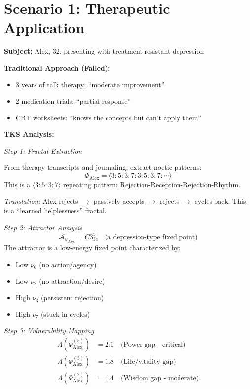 \documentclass[11pt,twoside]{book}
\theoremstyle{definition}
\theoremstyle{plain}
\theoremstyle{remark}
\newcommand{\noe}[1]{\nu_{#1}}
\newcommand{\Frac}{\Phi}
\newcommand{\PsychAttractor}{\mathcal{A}_\psi}
\newcommand{\Lacunarity}{\Lambda}
\begin{document}
\section{Scenario 1: Therapeutic Application}

\begin{tcolorbox}[colback=yellow!5!white,colframe=yellow!65!black,title=\textbf{Scenario: Depression Treatment via Attractor Shift},breakable]

\textbf{Subject:} Alex, 32, presenting with treatment-resistant depression

\textbf{Traditional Approach (Failed):}
\begin{itemize}
    \item 3 years of talk therapy: ``moderate improvement''
    \item 2 medication trials: ``partial response''
    \item CBT worksheets: ``knows the concepts but can't apply them''
\end{itemize}

\textbf{TKS Analysis:}

\textit{Step 1: Fractal Extraction}

From therapy transcripts and journaling, extract noetic patterns:
\[
    \Frac_{\mathrm{Alex}} = \langle 3:5:3:7:3:5:3:7:\cdots \rangle
\]
This is a $\langle 3:5:3:7 \rangle$ repeating pattern: Rejection-Reception-Rejection-Rhythm.

\textit{Translation:} Alex rejects $\to$ passively accepts $\to$ rejects $\to$ cycles back. This is a ``learned helplessness'' fractal.

\textit{Step 2: Attractor Analysis}
\[
    \PsychAttractor_{\mathrm{Alex}} = C3^5_{3c} \quad \text{(a depression-type fixed point)}
\]
The attractor is a low-energy fixed point characterized by:
\begin{itemize}
    \item Low $\noe{6}$ (no action/agency)
    \item Low $\noe{2}$ (no attraction/desire)
    \item High $\noe{3}$ (persistent rejection)
    \item High $\noe{7}$ (stuck in cycles)
\end{itemize}

\textit{Step 3: Vulnerability Mapping}
\begin{align*}
    \Lacunarity(\Frac_{\mathrm{Alex}}^{(5)}) &= 2.1 \quad \text{(Power gap - critical)} \\
    \Lacunarity(\Frac_{\mathrm{Alex}}^{(3)}) &= 1.8 \quad \text{(Life/vitality gap)} \\
    \Lacunarity(\Frac_{\mathrm{Alex}}^{(2)}) &= 1.4 \quad \text{(Wisdom gap - moderate)}
\end{align*}


\end{tcolorbox}
\end{document}
